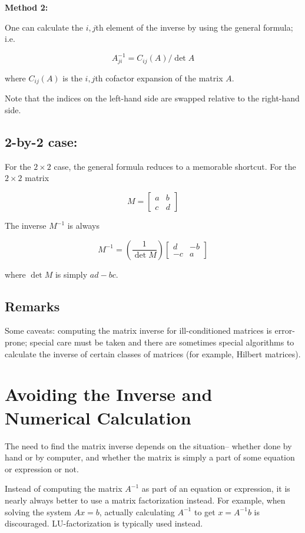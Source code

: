 \documentclass[12pt]{article}
\begin{document}
\textbf{Method 2:}

One can calculate the $i,j$th element of the inverse by using the general formula; i.e.

$$ A^{-1}_{ji} = C_{ij}(A) / \det{A} $$

where $C_{ij}(A)$ is the $i, j$th cofactor expansion of the matrix $A$.  

Note that the indices on the left-hand side are swapped relative to the right-hand side.  

\subsection{2-by-2 case:}

For the $2\times 2$ case, the general formula reduces to a memorable shortcut.  For the $2\times 2$ matrix 

$$ M = \begin{bmatrix}a & b \\ c & d \end{bmatrix} $$

The inverse $M^{-1}$ is always

$$ M^{-1} = \left(\frac{1}{\det M}\right) \begin{bmatrix}d & -b \\ -c & a\end{bmatrix} $$

where $\det M$ is simply $ad - bc$.

\subsection{Remarks}

Some caveats: computing the matrix inverse for ill-conditioned matrices is error-prone; special care must be taken and there are sometimes special algorithms to calculate the inverse of certain classes of matrices (for example, Hilbert matrices).  

\section{Avoiding the Inverse and Numerical Calculation}

The need to find the matrix inverse depends on the situation-- whether done by hand or by computer, and whether the matrix is simply a part of some equation or expression or not.  

Instead of computing the matrix $A^{-1}$ as part of an equation or expression, it is nearly always better to use a matrix factorization instead.  For example, when solving the system $Ax = b$, actually calculating $A^{-1}$ to get $x=A^{-1}b$ is discouraged.  LU-factorization is typically used instead.
\end{document}
